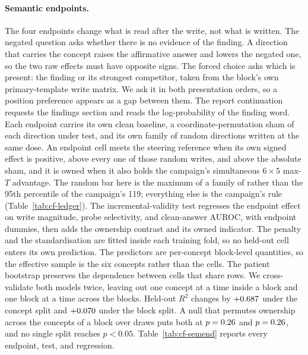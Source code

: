 \documentclass{article}
\begin{document}
\paragraph{Semantic endpoints.} The four endpoints change what is read after the write, not what is written. The negated question asks whether there is no evidence of the finding. A direction that carries the concept raises the affirmative answer and lowers the negated one, so the two raw effects must have opposite signs. The forced choice asks which is present: the finding or its strongest competitor, taken from the block's own primary-template write matrix. We ask it in both presentation orders, so a position preference appears as a gap between them. The report continuation requests the findings section and reads the log-probability of the finding word. Each endpoint carries its own clean baseline, a coordinate-permutation sham of each direction under test, and its own family of \cfSemLedgerRandom{} random directions written at the same dose. An endpoint cell meets the steering reference when its own signed effect is positive, above every one of those \cfSemLedgerRandom{} random writes, and above the absolute sham, and it is owned when it also holds the campaign's simultaneous $6\times5$ max-$T$ advantage. The random bar here is the maximum of a family of \cfSemLedgerRandom{} rather than the 95th percentile of the campaign's 119; everything else is the campaign's rule (Table~\ref{tab:cf-ledger}). The incremental-validity test regresses the endpoint effect on write magnitude, probe selectivity, and clean-answer AUROC, with endpoint dummies, then adds the ownership contrast and its owned indicator. The penalty and the standardisation are fitted inside each training fold, so no held-out cell enters its own prediction. The predictors are per-concept block-level quantities, so the effective sample is the six concepts rather than the cells. The patient bootstrap preserves the dependence between cells that share rows. We cross-validate both models twice, leaving out one concept at a time inside a block and one block at a time across the \cfSemCvBlocks{} blocks. Held-out $R^2$ changes by $+0.687$ under the concept split and $+0.070$ under the block split. A null that permutes ownership across the concepts of a block over \cfSemCvPerms{} draws puts both at $p=0.26$ and $p=0.26$, and no single split reaches $p<0.05$. Table~\ref{tab:cf-semend} reports every endpoint, test, and regression.
\end{document}
